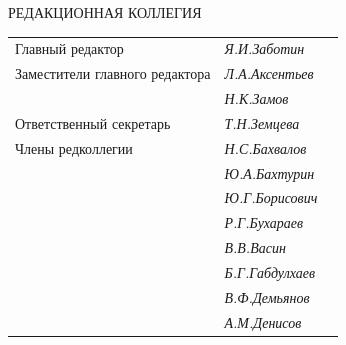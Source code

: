 




\pagestyle{empty}





\bigskip


\bigskip


\centerline{\Large РЕДАКЦИОННАЯ КОЛЛЕГИЯ}


\bigskip


\bigskip


\begin{tabular}{p{63mm}p{40mm}p{50mm}}


Главный редактор               &   \it Я.И.\;Заботин & \\


Заместители главного редактора &   \it Л.А.\;Аксентьев  & \\


                               &   \it Н.К.\;Замов  & \\


Ответственный секретарь        &   \it Т.Н.\;Земцева & \\[3mm]


Члены редколлегии              &   \it Н.С.\;Бахвалов & \\


                               &   \it Ю.А.\;Бахтурин  & \\


                               &   \it Ю.Г.\;Борисович & \\


                               &   \it Р.Г.\;Бухараев & \\


                               &   \it В.В.\;Васин  & \\


                               &   \it Б.Г.\;Габдулхаев & \\


                               &   \it В.Ф.\;Демьянов & \\


                               &   \it А.М.\;Денисов & \\



\end{tabular}
